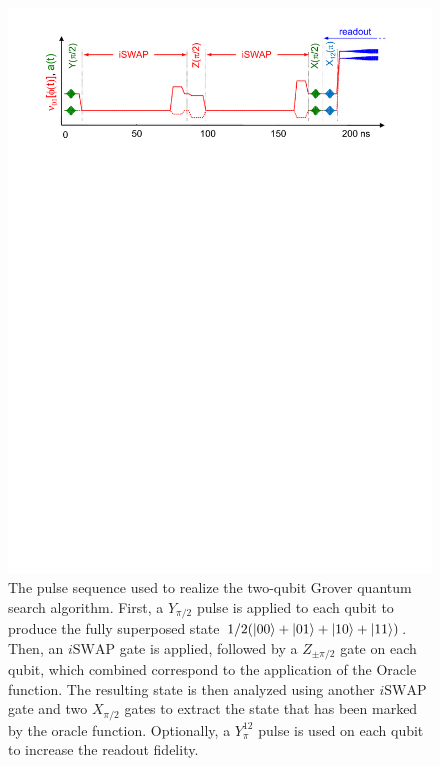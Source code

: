 \begin{figure}[h!]
	\centering
		\includegraphics[width=1.\textwidth]{./material/papers/grover/figures/grover_algorithm_pulse_sequence}
	\caption[Pulse sequence used for implementing the Grover search algorithm]{The pulse sequence used to realize the two-qubit Grover quantum search algorithm. First, a $Y_{\pi/2}$ pulse is applied to each qubit to produce the fully superposed state $1/2(\left| 00 \right>+\left| 01 \right>+\left| 10 \right>+\left| 11 \right>)$. Then, an $i\mathrm{SWAP}$ gate is applied, followed by a $Z_{\pm \pi /2}$ gate on each qubit, which combined correspond to the application of the Oracle function. The resulting state is then analyzed using another $i\mathrm{SWAP}$ gate and two $X_{\pi/2}$ gates to extract the state that has been marked by the oracle function. Optionally, a $Y^{12}_{\pi}$ pulse is used on each qubit to increase the readout fidelity.}
	\label{fig:GroverPulseSequence}
\end{figure}

